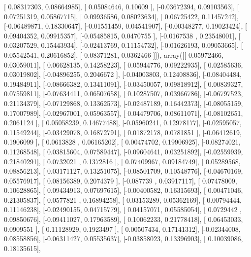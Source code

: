 \documentclass{article}
\begin{document}
       [ 0.08317303,  0.08664985],
       [ 0.05084646,  0.10609   ],
       [-0.03672394,  0.09103563],
       [ 0.07251319,  0.05867715],
       [ 0.09936586,  0.08023634],
       [ 0.06725422,  0.11457242],
       [-0.06489871,  0.18330647],
       [-0.01551459,  0.04541907],
       [-0.00348277,  0.19023424],
       [ 0.09404352,  0.09915357],
       [-0.05485815,  0.0470755 ],
       [-0.0167538 ,  0.23548001],
       [ 0.03207529,  0.15443934],
       [-0.02413769,  0.11154732],
       [-0.01626193,  0.09053665],
       [ 0.05542541,  0.20616852],
       [-0.08371281,  0.0362466 ]]), array([[ 0.05972466,  0.03059011],
       [ 0.06628135,  0.14258223],
       [ 0.05944776,  0.09222935],
       [ 0.02585636,  0.03019802],
       [-0.04896255,  0.2046672 ],
       [-0.04003803,  0.12408836],
       [-0.08404484,  0.19484911],
       [-0.08666382,  0.13411091],
       [-0.03450057,  0.09818912],
       [ 0.00839327,  0.07559811],
       [-0.07634411,  0.06507658],
       [ 0.10287507,  0.03966786],
       [-0.06797523,  0.21134379],
       [-0.07129868,  0.13362573],
       [-0.02487189,  0.16442373],
       [-0.08055159,  0.17007989],
       [-0.02967001,  0.05963557],
       [ 0.04479706,  0.08611071],
       [-0.08102651,  0.2061124 ],
       [ 0.05058239,  0.14677488],
       [-0.05960241,  0.12978177],
       [-0.02595057,  0.11549244],
       [-0.03429078,  0.16872791],
       [ 0.01872178,  0.0781851 ],
       [-0.06412619,  0.1906099 ],
       [ 0.0613828 ,  0.06165202],
       [ 0.00474702,  0.19906925],
       [-0.08274021,  0.11268548],
       [ 0.03815604,  0.07589447],
       [-0.09604641,  0.03251892],
       [-0.02559939,  0.21840291],
       [ 0.0732021 ,  0.1372816 ],
       [ 0.07409967,  0.09184749],
       [ 0.05289568,  0.08856213],
       [ 0.03171127,  0.13251075],
       [-0.08501709,  0.10548776],
       [-0.04670169,  0.05576917],
       [ 0.08156389,  0.2074379 ],
       [-0.087739  ,  0.03917117],
       [ 0.07478009,  0.10628865],
       [ 0.09434913,  0.07697615],
       [-0.00400582,  0.16315693],
       [ 0.00471046,  0.21305837],
       [ 0.0577821 ,  0.16894258],
       [ 0.03153289,  0.05362169],
       [-0.00794444,  0.11146238],
       [-0.02490155,  0.04715779],
       [ 0.04157071,  0.05585054],
       [ 0.0729442 ,  0.09850676],
       [-0.09411027,  0.17963589],
       [ 0.10062233,  0.21778418],
       [ 0.06453033,  0.0909551 ],
       [ 0.11128929,  0.1923497 ],
       [ 0.00507434,  0.17141312],
       [-0.02344008,  0.08558856],
       [-0.06311427,  0.05535637],
       [-0.03858023,  0.13396903],
       [ 0.10039086,  0.18135615],
\end{document}
